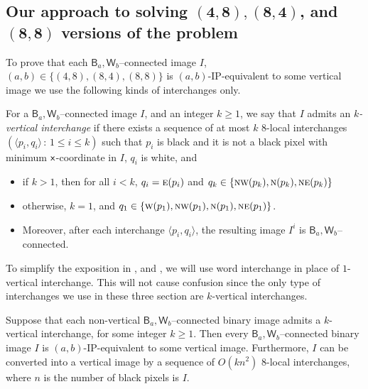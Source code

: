 \documentclass[lotsofwhite,charterfonts]{patmorin}
\newcommand{\N}{\textsc{n}}
\newcommand{\NE}{\textsc{ne}}
\newcommand{\E}{\textsc{e}}
\newcommand{\W}{\textsc{w}}
\newcommand{\NW}{\textsc{nw}}
\newcommand{\x}{\ensuremath{\protect\textup{\textsf{x}}}}
\newcommand{\ic}[2]{\langle #1,#2 \rangle}
\begin{document}
\subsection{Our approach to solving $\mathbf{(4,8), (8,4)}$, and $\mathbf{(8,8)}$ versions of the problem}

To prove that each $\textsf{B}_a,\textsf{W}_b$--connected image $I$, $(a,b)\in \{(4,8), (8,4), (8,8)\}$ is $(a,b)$-IP-equivalent to some vertical image we use the following kinds of interchanges only.

For a $\textsf{B}_a,\textsf{W}_b$--connected image $I$, and an integer $k\geq 1$, we say that $I$ admits an \emph{$k$-vertical interchange} if there exists a sequence of at most $k$ $8$-local interchanges $(\ic{p_i}{q_i}\, :\, 1\leq i\leq k)$ such that $p_i$ is black and it is not a black pixel  with minimum \x-coordinate in $I$, $q_i$ is white, and 
\begin{itemize}
\item if $k>1$, then for all $i<k$, $q_i=\E(p_i)$ and $q_k\in\{\NW(p_k),\N(p_k),\NE(p_k)\}$ 
\item otherwise, $k=1$, and $q_1\in\{\W(p_1),\NW(p_1),\N(p_1),\NE(p_1)\}$.

\item[]Moreover, after each interchange $\ic{p_i}{q_i}$, the resulting image $I^i$ is $\textsf{B}_a,\textsf{W}_b$--connected. 
\end{itemize}

To simplify the exposition in ,  and , we will use word interchange in place of $1$-vertical interchange. This will not cause confusion since the only type of interchanges we use in these three section are $k$-vertical interchanges.

\begin{lem}
Suppose that each non-vertical $\textsf{B}_a,\textsf{W}_b$--connected binary image admits a $k$-vertical interchange, for some integer $k\geq 1$. Then every $\textsf{B}_a,\textsf{W}_b$--connected binary image $I$ is $(a,b)$-IP-equivalent to some vertical image. Furthermore, $I$ can be converted into a vertical image by a sequence of $O(kn^2)$ 8-local interchanges, where $n$ is the number of black pixels is $I$.
\end{lem}
\end{document}
